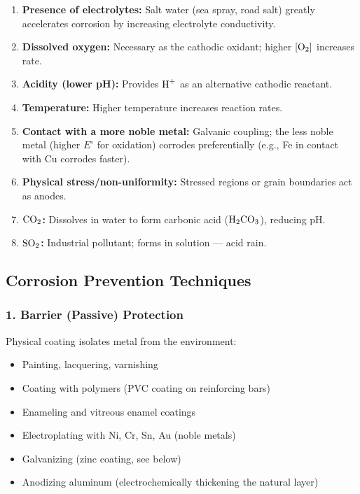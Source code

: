 \begin{enumerate}
    \item \textbf{Presence of electrolytes:} Salt water (sea spray, road salt) greatly accelerates corrosion by increasing electrolyte conductivity.
    \item \textbf{Dissolved oxygen:} Necessary as the cathodic oxidant; higher $[\ce{O2}]$ increases rate.
    \item \textbf{Acidity (lower pH):} Provides $\ce{H+}$ as an alternative cathodic reactant.
    \item \textbf{Temperature:} Higher temperature increases reaction rates.
    \item \textbf{Contact with a more noble metal:} Galvanic coupling; the less noble metal (higher $E^\circ$ for oxidation) corrodes preferentially (e.g., Fe in contact with Cu corrodes faster).
    \item \textbf{Physical stress/non-uniformity:} Stressed regions or grain boundaries act as anodes.
    \item \textbf{$\ce{CO2}$:} Dissolves in water to form carbonic acid ($\ce{H2CO3}$), reducing pH.
    \item \textbf{$\ce{SO2}$:} Industrial pollutant; forms  in solution --- acid rain.
\end{enumerate}

\subsection{Corrosion Prevention Techniques}

\subsubsection{1. Barrier (Passive) Protection}
Physical coating isolates metal from the environment:
\begin{itemize}
    \item Painting, lacquering, varnishing
    \item Coating with polymers (PVC coating on reinforcing bars)
    \item Enameling and vitreous enamel coatings
    \item Electroplating with Ni, Cr, Sn, Au (noble metals)
    \item Galvanizing (zinc coating, see below)
    \item Anodizing aluminum (electrochemically thickening the natural  layer)
\end{itemize}

